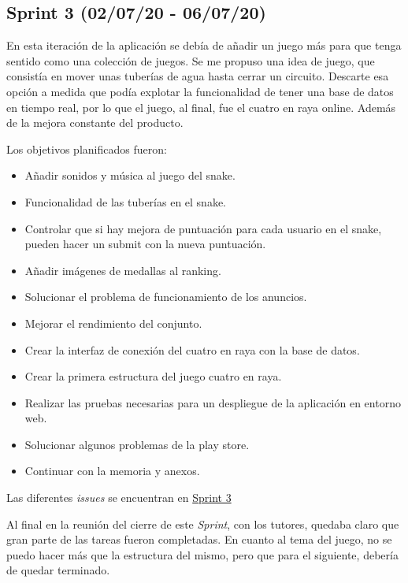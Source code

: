 \subsection{Sprint 3 (02/07/20 - 06/07/20)}\label{sprint-3-020720---070720}
En esta iteración de la aplicación se debía de añadir un juego más para que tenga sentido como una colección de juegos. Se me propuso una idea de juego, que consistía en mover unas tuberías de agua hasta cerrar un circuito. Descarte esa opción a medida que podía explotar la funcionalidad de tener una base de datos en tiempo real, por lo que el juego, al final, fue el cuatro en raya online. Además de la mejora constante del producto.

Los objetivos planificados fueron:
\begin{itemize}
	\item Añadir sonidos y música al juego del snake.
	\item Funcionalidad de las tuberías en el snake.
	\item Controlar que si hay mejora de puntuación para cada usuario en el snake, pueden hacer un submit con la nueva puntuación.
	\item Añadir imágenes de medallas al ranking.
	\item Solucionar el problema de funcionamiento de los anuncios.
	\item Mejorar el rendimiento del conjunto.
	\item Crear la interfaz de conexión del cuatro en raya con la base de datos.
	\item Crear la primera estructura del juego cuatro en raya.
	\item Realizar las pruebas necesarias para un despliegue de la aplicación en entorno web.
	\item Solucionar algunos problemas de la play store.
	\item Continuar con la memoria y anexos.
\end{itemize}

Las diferentes \emph{issues} se encuentran en \href{https://github.com/scc0034/flutter_serpiente/milestone/3?closed=1}{Sprint 3}


Al final en la reunión del cierre de este \emph{Sprint}, con los tutores, quedaba claro que gran parte de las tareas fueron completadas. En cuanto al tema del juego, no se puedo hacer más que la estructura del mismo, pero que para el siguiente, debería de quedar terminado.

